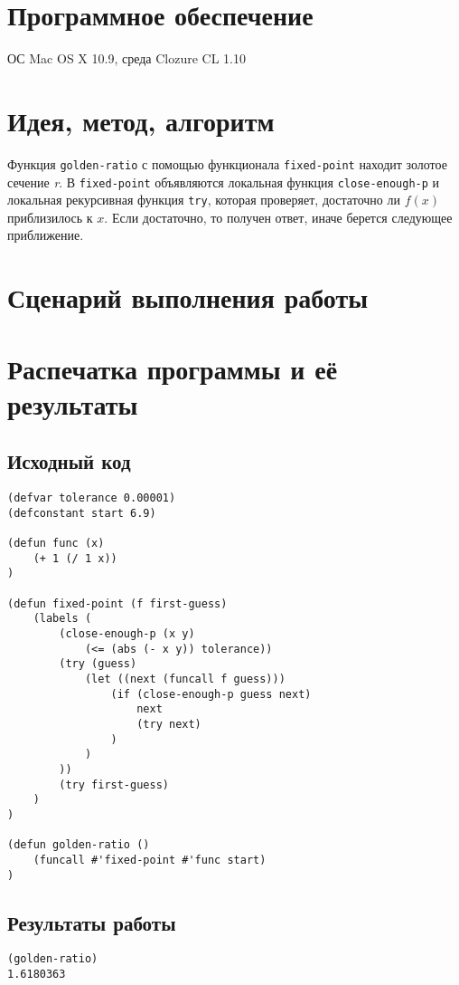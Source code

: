 \documentclass[a4paper, 12pt]{article}
\begin{document}
\section{Программное обеспечение}
ОС Mac OS X 10.9, среда Clozure CL 1.10


\section{Идея, метод, алгоритм}
Функция {\tt golden-ratio} с помощью функционала {\tt fixed-point} находит золотое сечение \textit{r}. В {\tt fixed-point} объявляются локальная функция {\tt close-enough-p} и локальная рекурсивная функция {\tt try}, которая проверяет, достаточно ли \(f(x)\) приблизилось к \(x\). Если достаточно, то получен ответ, иначе берется следующее приближение.


\section{Сценарий выполнения работы}


\section{Распечатка программы и её результаты}

\subsection{Исходный код}
\begin{lstlisting}
(defvar tolerance 0.00001)
(defconstant start 6.9)

(defun func (x)
    (+ 1 (/ 1 x))
)

(defun fixed-point (f first-guess)
    (labels (
        (close-enough-p (x y)
            (<= (abs (- x y)) tolerance))
        (try (guess)
            (let ((next (funcall f guess)))
                (if (close-enough-p guess next)
                    next
                    (try next)
                )
            )
        ))
        (try first-guess)
    )
)

(defun golden-ratio ()
    (funcall #'fixed-point #'func start)
)
\end{lstlisting}

\subsection{Результаты работы}
\begin{lstlisting}
(golden-ratio)
1.6180363
\end{lstlisting}
\end{document}
